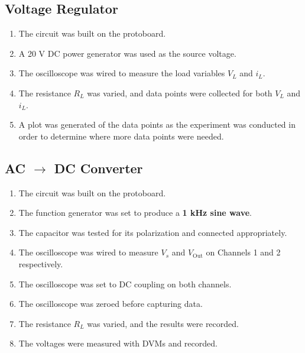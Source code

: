\documentclass[twocolumn,english]{IEEEtran}
\begin{document}
\subsection{Voltage Regulator}
  \begin{enumerate}
   \item The circuit was built on the protoboard. %
   \item A 20 V DC power generator was used as the source voltage.
   \item The oscilloscope was wired to measure the load variables $V_L$ and $i_L$.
   \item The resistance $R_L$ was varied, and data points were collected for both $V_L$ and $i_L$.
   \item A plot was generated of the data points as the experiment was conducted in order to determine where more data points were needed.
  \end{enumerate}

\subsection{AC $\rightarrow$ DC Converter} %
  \begin{enumerate}
    \item The circuit was built on the protoboard. %
    \item The function generator was set to produce a \textbf{1 kHz sine wave}.
    \item The capacitor was tested for its polarization and connected appropriately.
    \item The oscilloscope was wired to measure $V_s$ and $V_{\text{Out}}$ on Channels 1 and 2 respectively.
    \item The oscilloscope was set to DC coupling on both channels.
    \item The oscilloscope was zeroed before capturing data. %
    \item The resistance $R_L$ was varied, and the results were recorded.
    \item The voltages were measured with DVMs and recorded. %
  \end{enumerate}
\end{document}
